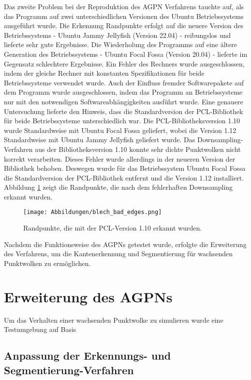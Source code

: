 Das zweite Problem bei der Reproduktion des AGPN Verfahrens tauchte auf, als das Programm auf zwei unterschiedlichen Versionen des Ubuntu Betriebssystems ausgeführt wurde. Die Erkennung Randpunkte erfolgt auf die neuere Version des Betriebssystems - Ubuntu Jammy Jellyfish (Version 22.04) - reibungslos und lieferte sehr gute Ergebnisse. Die Wiederholung des Programms auf eine ältere Generation des Betriebssystems - Ubuntu Focal Fossa (Version 20.04) - lieferte im Gegensatz schlechtere Ergebnisse. Ein Fehler des Rechners wurde ausgeschlossen, indem der gleiche Rechner mit konstanten Spezifikationen für beide Betriebssysteme verwendet wurde. Auch der Einfluss fremder Softwarepakete auf dem Programm wurde ausgeschlossen, indem das Programm an Betriebssysteme nur mit den notwendigen Softwareabhängigkeiten ausführt wurde. Eine genauere Untersuchung lieferte den Hinweis, dass die Standardversion der PCL-Bibliothek für beide Betriebssysteme unterschiedlich war. Die PCL-Bibliotheksversion 1.10 wurde Standardweise mit Ubuntu Focal Fossa geliefert, wobei die Version 1.12 Standardweise mit Ubuntu Jammy Jellyfish geliefert wurde. Das Downsampling-Verfahren aus der Bibliotheksversion 1.10 konnte sehr dichte Punktwolken nicht korrekt verarbeiten. Dieses Fehler wurde allerdings in der neueren Version der Bibliothek behoben. Deswegen wurde für das Betriebssystem Ubuntu Focal Fossa die Standardversion der PCL-Bibliothek entfernt und die Version 1.12 installiert. Abbildung \ref{bad_edges} zeigt die Randpunkte, die nach dem fehlerhaften Downsampling erkannt wurden.

\begin{figure}[h]
	\texttt{[image: Abbildungen/blech\_bad\_edges.png]}
	\centering
	\caption{Randpunkte, die mit der PCL-Version 1.10 erkannt wurden.}
	\label{bad_edges}
\end{figure}

Nachdem die Funktionsweise des AGPNs getestet wurde, erfolgte die Erweiterung des Verfahrens, um die Kantenerkennung und Segmentierung für wachsenden Punktwolken zu ermöglichen.

\section{Erweiterung des AGPNs}
Um das Verhalten einer wachsenden Punktwolke zu simulieren wurde eine Testumgebung auf Basis 
\subsection{Anpassung der Erkennungs- und Segmentierung-Verfahren}


